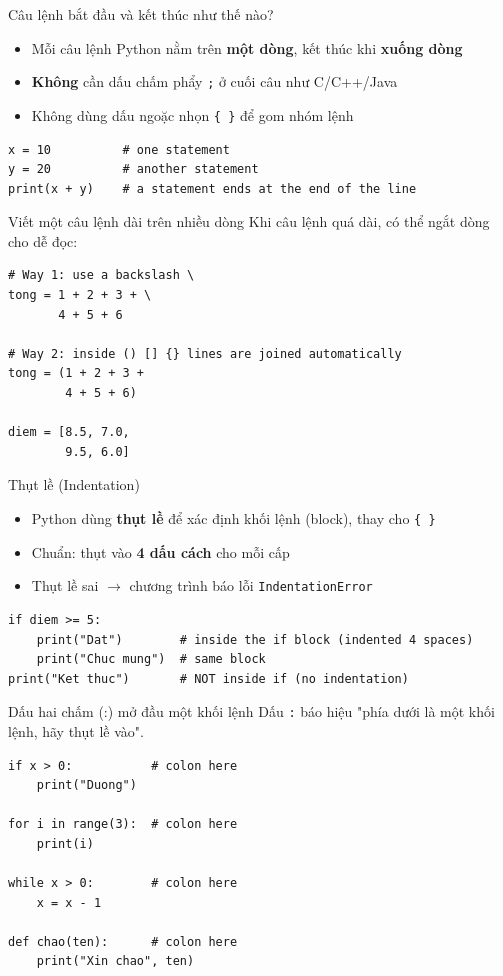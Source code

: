 \documentclass[11pt]{beamer}
\begin{document}
\begin{frame}[fragile]{Câu lệnh bắt đầu và kết thúc như thế nào?}
\begin{itemize}
  \item Mỗi câu lệnh Python nằm trên \textbf{một dòng}, kết thúc khi \textbf{xuống dòng}
  \item \textbf{Không} cần dấu chấm phẩy \texttt{;} ở cuối câu như C/C++/Java
  \item Không dùng dấu ngoặc nhọn \texttt{\{ \}} để gom nhóm lệnh
\end{itemize}
\begin{lstlisting}
x = 10          # one statement
y = 20          # another statement
print(x + y)    # a statement ends at the end of the line
\end{lstlisting}
\end{frame}

\begin{frame}[fragile]{Viết một câu lệnh dài trên nhiều dòng}
Khi câu lệnh quá dài, có thể ngắt dòng cho dễ đọc:
\begin{lstlisting}
# Way 1: use a backslash \
tong = 1 + 2 + 3 + \
       4 + 5 + 6

# Way 2: inside () [] {} lines are joined automatically
tong = (1 + 2 + 3 +
        4 + 5 + 6)

diem = [8.5, 7.0,
        9.5, 6.0]
\end{lstlisting}
\end{frame}

\begin{frame}[fragile]{Thụt lề (Indentation)}
\begin{itemize}
  \item Python dùng \textbf{thụt lề} để xác định khối lệnh (block), thay cho \texttt{\{ \}}
  \item Chuẩn: thụt vào \textbf{4 dấu cách} cho mỗi cấp
  \item Thụt lề sai $\to$ chương trình báo lỗi \texttt{IndentationError}
\end{itemize}
\begin{lstlisting}
if diem >= 5:
    print("Dat")        # inside the if block (indented 4 spaces)
    print("Chuc mung")  # same block
print("Ket thuc")       # NOT inside if (no indentation)
\end{lstlisting}
\end{frame}

\begin{frame}[fragile]{Dấu hai chấm (:) mở đầu một khối lệnh}
Dấu \texttt{:} báo hiệu "phía dưới là một khối lệnh, hãy thụt lề vào".
\begin{lstlisting}
if x > 0:           # colon here
    print("Duong")

for i in range(3):  # colon here
    print(i)

while x > 0:        # colon here
    x = x - 1

def chao(ten):      # colon here
    print("Xin chao", ten)
\end{lstlisting}
\end{frame}
\end{document}
